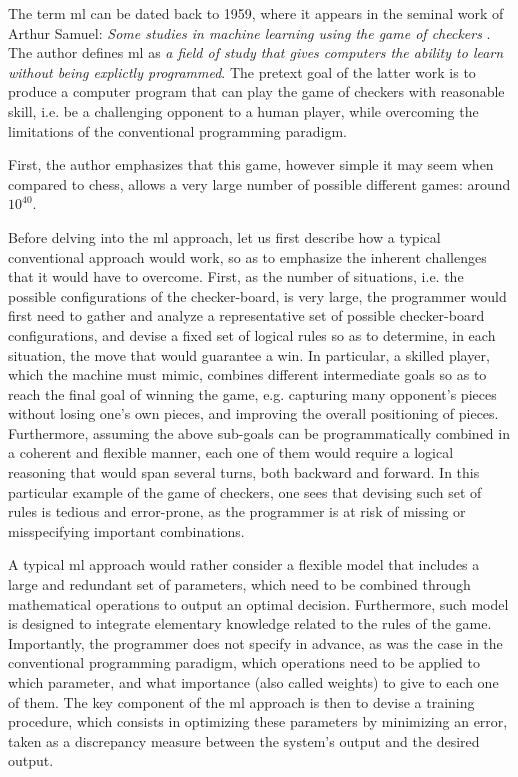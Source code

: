 The term \gls{ml} can be dated back to 1959, where it appears in the seminal work of Arthur Samuel: \textit{Some studies in machine learning using the game of checkers} \cite{samuel59}.
The author defines \gls{ml} as \textit{a field of study that gives computers the ability to learn without being explictly programmed}.
The pretext goal of the latter work is to produce a computer program that can play the game of checkers with reasonable skill, i.e. be a challenging opponent to a human player, while overcoming the limitations of the conventional programming paradigm.

First, the author emphasizes that this game, however simple it may seem when compared to chess, allows a very large number of possible different games: around $10^{40}$.

Before delving into the \gls{ml} approach, let us first describe how a typical conventional approach would work, so as to emphasize the inherent challenges that it would have to overcome.
First, as the number of situations, i.e. the possible configurations of the checker-board, is very large, the programmer would first need to gather and analyze a representative set of possible checker-board configurations, and devise a fixed set of logical rules so as to determine, in each situation, the move that would guarantee a win.
In particular, a skilled player, which the machine must mimic, combines different intermediate goals so as to reach the final goal of winning the game, e.g. capturing many opponent's pieces without losing one's own pieces, and improving the overall positioning of pieces.
Furthermore, assuming the above sub-goals can be programmatically combined in a coherent and flexible manner, each one of them would require a logical reasoning that would span several turns, both backward and forward.
In this particular example of the game of checkers, one sees that devising such set of rules is tedious and error-prone, as the programmer is at risk of missing or misspecifying important combinations.

A typical \gls{ml} approach would rather consider a flexible model that includes a large and redundant set of parameters, which need to be combined through mathematical operations to output an optimal decision.
Furthermore, such model is designed to integrate elementary knowledge related to the rules of the game.
Importantly, the programmer does not specify in advance, as was the case in the conventional programming paradigm, which operations need to be applied to which parameter, and what importance (also called weights) to give to each one of them.
The key component of the \gls{ml} approach is then to devise a training procedure, which consists in optimizing these parameters by minimizing an error, taken as a discrepancy measure between the system's output and the desired output.


